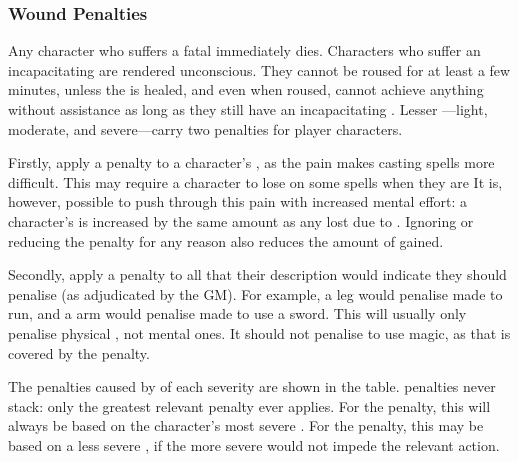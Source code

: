 \subsubsection{Wound Penalties}

Any character who suffers a fatal {\wound} immediately dies.
Characters who suffer an incapacitating {\wound} are rendered unconscious.
They cannot be roused for at least a few minutes, unless the {\wound} is healed, and even when roused, cannot achieve anything without assistance as long as they still have an incapacitating {\wound}.
Lesser {\wounds}---light, moderate, and severe---carry two penalties for player characters.


Firstly, {\wounds} apply a penalty to a character's {\focus}, as the pain makes casting spells more difficult.
This may require a character to lose {\concentration} on some spells when they are {\wounded}
It is, however, possible to push through this pain with increased mental effort: a character's {\overchannel} is increased by the same amount as any {\focus} lost due to {\wounds}.
Ignoring or reducing the {\focus} penalty for any reason also reduces the amount of {\overchannel} gained.

Secondly, {\wounds} apply a penalty to all {\tests} that their description would indicate they should penalise (as adjudicated by the GM).
For example, a {\wounded} leg would penalise {\tests} made to run, and a {\wounded} arm would penalise {\tests} made to use a sword.
This will usually only penalise physical {\tests}, not mental ones.
It should not penalise {\tests} to use magic, as that is covered by the {\focus} penalty.

The penalties caused by {\wounds} of each severity are shown in the  table.
\capital{\wound} penalties never stack: only the greatest relevant {\wound} penalty ever applies.
For the {\focus} penalty, this will always be based on the character's most severe {\wound}.
For the {\test} penalty, this may be based on a less severe {\wound}, if the more severe {\wound} would not impede the relevant action.

